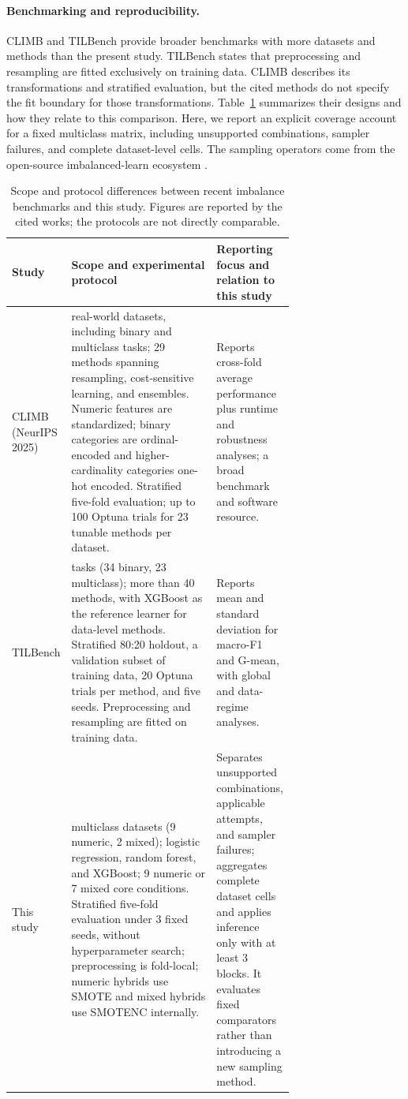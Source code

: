 \documentclass[10pt]{article}
\begin{document}
\paragraph{Benchmarking and reproducibility.}
CLIMB and TILBench provide broader benchmarks with more datasets and methods than the present study. TILBench states that preprocessing and resampling are fitted exclusively on training data. CLIMB describes its transformations and stratified evaluation, but the cited methods do not specify the fit boundary for those transformations. Table~\ref{tab:benchmark-comparison} summarizes their designs and how they relate to this comparison. Here, we report an explicit coverage account for a fixed multiclass matrix, including unsupported combinations, sampler failures, and complete dataset-level cells. The sampling operators come from the open-source imbalanced-learn ecosystem \citep{lemaitre2017imbalanced}.

\begin{table}[t]
\centering
\caption{Scope and protocol differences between recent imbalance benchmarks and this study. Figures are reported by the cited works; the protocols are not directly comparable.}
\label{tab:benchmark-comparison}
\footnotesize
\begin{tabularx}{\linewidth}{@{}>{\raggedright\arraybackslash}p{0.14\linewidth}>{\raggedright\arraybackslash}p{0.57\linewidth}X@{}}
\toprule
Study & Scope and experimental protocol & Reporting focus and relation to this study \\
\midrule
CLIMB (NeurIPS 2025) \citep{liu2025climb} & 73 real-world datasets, including binary and multiclass tasks; 29 methods spanning resampling, cost-sensitive learning, and ensembles. Numeric features are standardized; binary categories are ordinal-encoded and higher-cardinality categories one-hot encoded. Stratified five-fold evaluation; up to 100 Optuna trials for 23 tunable methods per dataset. & Reports cross-fold average performance plus runtime and robustness analyses; a broad benchmark and software resource. \\
TILBench \citep{liu2026tilbenchv2} & 57 tasks (34 binary, 23 multiclass); more than 40 methods, with XGBoost as the reference learner for data-level methods. Stratified 80:20 holdout, a validation subset of training data, 20 Optuna trials per method, and five seeds. Preprocessing and resampling are fitted on training data. & Reports mean and standard deviation for macro-F1 and G-mean, with global and data-regime analyses. \\
This study & 11 multiclass datasets (9 numeric, 2 mixed); logistic regression, random forest, and XGBoost; 9 numeric or 7 mixed core conditions. Stratified five-fold evaluation under 3 fixed seeds, without hyperparameter search; preprocessing is fold-local; numeric hybrids use SMOTE and mixed hybrids use SMOTENC internally. & Separates unsupported combinations, applicable attempts, and sampler failures; aggregates complete dataset cells and applies inference only with at least 3 blocks. It evaluates fixed comparators rather than introducing a new sampling method. \\
\bottomrule
\end{tabularx}
\end{table}
\end{document}
